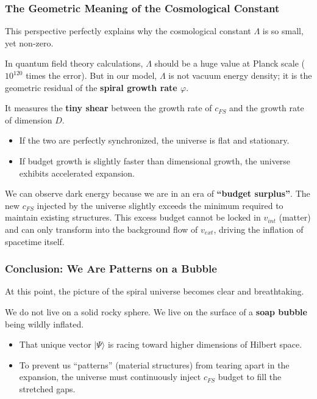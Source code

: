 \subsubsection{The Geometric Meaning of the Cosmological Constant}

This perspective perfectly explains why the cosmological constant $\Lambda$ is so small, yet non-zero.

In quantum field theory calculations, $\Lambda$ should be a huge value at Planck scale ($10^{120}$ times the error). But in our model, $\Lambda$ is not vacuum energy density; it is the geometric residual of the \textbf{spiral growth rate $\varphi$}.

It measures the \textbf{tiny shear} between the growth rate of $c_{FS}$ and the growth rate of dimension $D$.

\begin{itemize}
\item If the two are perfectly synchronized, the universe is flat and stationary.

\item If budget growth is slightly faster than dimensional growth, the universe exhibits accelerated expansion.
\end{itemize}

We can observe dark energy because we are in an era of \textbf{``budget surplus''}. The new $c_{FS}$ injected by the universe slightly exceeds the minimum required to maintain existing structures. This excess budget cannot be locked in $v_{int}$ (matter) and can only transform into the background flow of $v_{ext}$, driving the inflation of spacetime itself.

\subsubsection{Conclusion: We Are Patterns on a Bubble}

At this point, the picture of the spiral universe becomes clear and breathtaking.

We do not live on a solid rocky sphere. We live on the surface of a \textbf{soap bubble} being wildly inflated.

\begin{itemize}
\item That unique vector $|\Psi\rangle$ is racing toward higher dimensions of Hilbert space.

\item To prevent us ``patterns'' (material structures) from tearing apart in the expansion, the universe must continuously inject $c_{FS}$ budget to fill the stretched gaps.
\end{itemize}

